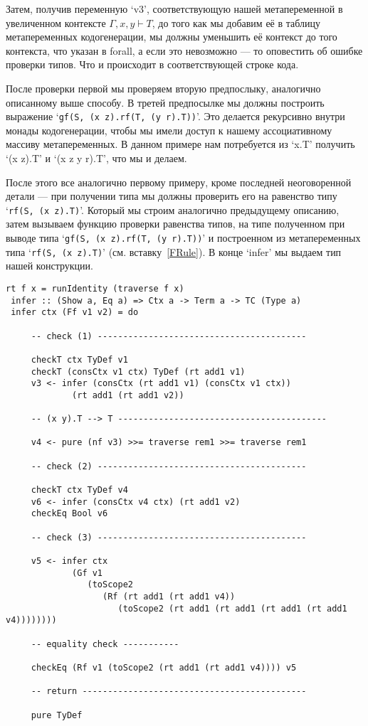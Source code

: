 Затем, получив переменную `v3', соответствующую нашей метапеременной в увеличенном контексте $\Gamma, x, y \vdash T$, до того как мы добавим её в таблицу метапеременных кодогенерации, мы должны уменьшить её контекст до того контекста, что указан в forall, а если это невозможно --- то оповестить об ошибке проверки типов. Что и происходит в соответствующей строке кода.

После проверки первой мы проверяем вторую предпослыку, аналогично описанному выше способу. В третей предпосылке мы должны построить выражение `\lstinline{gf(S, (x z).rf(T, (y r).T))}'. Это делается рекурсивно внутри монады кодогенерации, чтобы мы имели доступ к нашему ассоциативному массиву метапеременных. В данном примере нам потребуется из `x.T' получить `(x z).T' и `(x z y r).T', что мы и делаем.

После этого все аналогично первому примеру, кроме последней неоговоренной детали --- при получении типа мы должны проверить его на равенство типу  `\lstinline{rf(S, (x z).T)}'. Который мы строим аналогично предыдущему описанию, затем вызываем функцию проверки равенства типов, на типе полученном при выводе типа `\lstinline{gf(S, (x z).rf(T, (y r).T))}' и построенном из метапеременных типа `\lstinline{rf(S, (x z).T)}' (см. вставку~\ref{FRule}). В конце `infer' мы выдаем тип нашей конструкции.

\begin{lstlisting}[caption={Искусственный пример случая несоответствия контекстов: контекст t нужно сократить до использования в предпосылке.},label={FRule},captionpos=b, frame=single, float, floatplacement=H]
 rt f x = runIdentity (traverse f x)
 infer :: (Show a, Eq a) => Ctx a -> Term a -> TC (Type a)
 infer ctx (Ff v1 v2) = do

     -- check (1) -----------------------------------------

     checkT ctx TyDef v1
     checkT (consCtx v1 ctx) TyDef (rt add1 v1)
     v3 <- infer (consCtx (rt add1 v1) (consCtx v1 ctx))
             (rt add1 (rt add1 v2))

     -- (x y).T --> T -----------------------------------------

     v4 <- pure (nf v3) >>= traverse rem1 >>= traverse rem1

     -- check (2) -----------------------------------------

     checkT ctx TyDef v4
     v6 <- infer (consCtx v4 ctx) (rt add1 v2)
     checkEq Bool v6

     -- check (3) -----------------------------------------

     v5 <- infer ctx
             (Gf v1
                (toScope2
                   (Rf (rt add1 (rt add1 v4))
                      (toScope2 (rt add1 (rt add1 (rt add1 (rt add1 v4))))))))

     -- equality check -----------

     checkEq (Rf v1 (toScope2 (rt add1 (rt add1 v4)))) v5

     -- return --------------------------------------------

     pure TyDef
\end{lstlisting}
